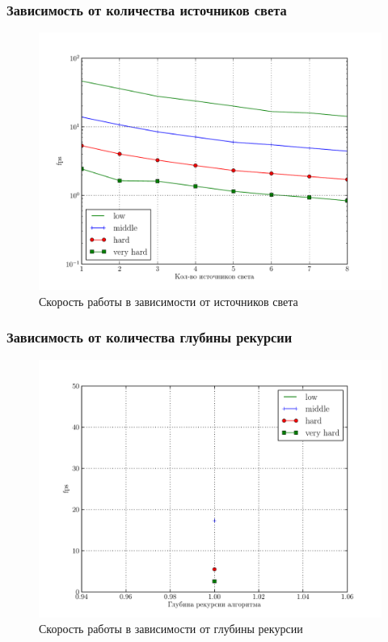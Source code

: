 \documentclass[12pt, a4paper, utf8]{article}
\begin{document}
\subsubsection{Зависимость от количества источников света}



\begin{figure}[H]
\centering
\includegraphics[width=\textwidth]{perf/performance_light.pdf}
\caption{Скорость работы в зависимости от источников света}\label{fig:performance_light}
\end{figure}

\subsubsection{Зависимость от количества глубины рекурсии}



\begin{figure}[H]
\centering
\includegraphics[width=\textwidth]{perf/performance_d.pdf}
\caption{Скорость работы в зависимости от глубины рекурсии}\label{fig:performance_d}
\end{figure}
\end{document}
